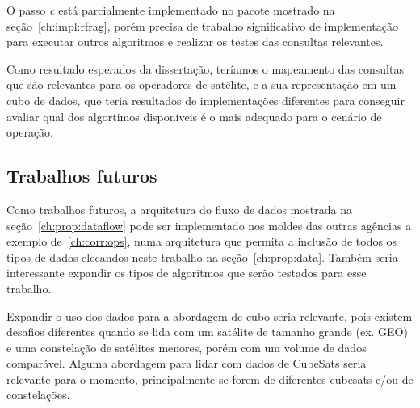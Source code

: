 O passo \textit{c} está parcialmente implementado no pacote mostrado na seção~\ref{ch:impl:rfrag}, porém precisa de trabalho significativo de implementação para executar outros algoritmos e realizar os testes das consultas relevantes.

Como resultado esperados da dissertação, teríamos o mapeamento das consultas que são relevantes para os operadores de satélite, e a sua representação em um cubo de dados, que teria resultados de implementações diferentes para conseguir avaliar qual dos algortimos disponíveis é o mais adequado para o cenário de operação.

\subsection{Trabalhos futuros}
\label{ch:concl:planning:future}

Como trabalhos futuros, a arquitetura do fluxo de dados mostrada na seção~\ref{ch:prop:dataflow} pode ser implementado nos moldes das outras agências a exemplo de~\ref{ch:corr:ops}, numa arquitetura que permita a inclusão de todos os tipos de dados elecandos neste trabalho na seção~\ref{ch:prop:data}.
Também seria interessante expandir os tipos de algoritmos que serão testados para esse trabalho.

Expandir o uso dos dados para a abordagem de cubo seria relevante, pois existem desafios diferentes quando se lida com um satélite de tamanho grande (ex. GEO) e uma constelação de satélites menores, porém com um volume de dados comparável.
Alguma abordagem para lidar com dados de CubeSats seria relevante para o momento, principalmente se forem de diferentes cubesats e/ou de constelações.


